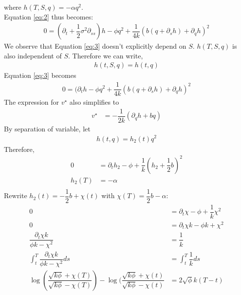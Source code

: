\documentclass{article}
\begin{document}
where $h(T,S,q) = -\alpha q^2$.\\
Equation \eqref{eq:2} thus becomes:
\begin{equation}
    \begin{split}
        0 = (\partial_t +\dfrac{1}{2} \sigma^2\partial_{ss})h - \phi q^2 + \dfrac{1}{4k}(b(q+\partial_{s}h)+\partial_{q}h)^2\label{eq:3}
    \end{split}
\end{equation}
We observe that Equation \eqref{eq:3} doesn't explicitly depend on $S$. $h(T,S,q)$ is also independent of $S$. Therefore we can write,
\begin{equation*}
    \begin{split}
       h(t,S,q) = h(t,q)
    \end{split}
\end{equation*}
Equation \eqref{eq:3} becomes\\
\begin{equation*}
    \begin{split}
        0 = (\partial_{t}h - \phi q^2 +\dfrac{1}{4k}(b(q+\partial_{s}h)+\partial_{q}h)^2
    \end{split}
\end{equation*}
The expression for $v^{\star}$ also simplifies to
\begin{equation*}
    \begin{split}
        v^{\star} &= -\dfrac{1}{2k}(\partial_{q}h +bq)
    \end{split}
\end{equation*} 
By separation of variable, let 
\begin{equation*}
    \begin{split}
        h(t,q) = h_{2}(t)q^2
    \end{split}
\end{equation*} 
Therefore,\\
\begin{equation*}
    \begin{split}
        0 &= \partial_{t}h_{2} - \phi +\dfrac{1}{k}(h_{2} + \dfrac{1}{2}b)^2\\
        h_{2}(T) &= -\alpha\\
    \end{split}
\end{equation*}
Rewrite $h_{2}(t) = -\dfrac{1}{2}b + \chi(t)$ with $\chi(T) = \dfrac{1}{2}b - \alpha$:
\begin{equation*}
    \begin{split}
        0 &= \partial_{t}\chi - \phi +\dfrac{1}{k}\chi^2\\
        0 &= \partial_{t}\chi k- \phi k +\chi^2\\
        \dfrac{\partial_{t}\chi k}{\phi k - \chi^2} &= \dfrac{1}{k}\\
        \int_{t}^{T}  \dfrac{\partial_{t}\chi k}{\phi k - \chi^2}  ds &=\int_{t}^{T} \dfrac{1}{k} ds\\
        \log(\dfrac{\sqrt{k\phi}+\chi(T)}{\sqrt{k\phi}-\chi(T)}) - \log(\dfrac{\sqrt{k\phi}+\chi(t)}{\sqrt{k\phi}-\chi(t)} &= 2 \sqrt{\phi}{k}(T-t)\\
    \end{split}
\end{equation*}
\end{document}
